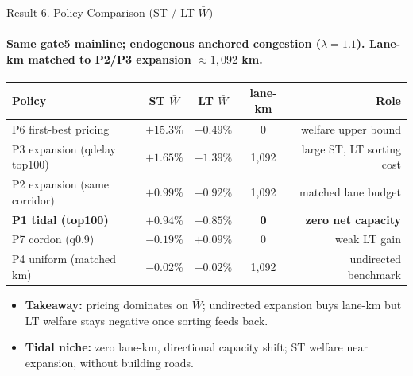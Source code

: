\documentclass[11pt,aspectratio=169]{beamer}
\newcommand{\good}[1]{\textcolor{blue!70!black}{#1}}
\newcommand{\bad}[1]{\textcolor{red!70!black}{#1}}
\newcommand{\app}[1]{\hyperlink{#1}{\beamergotobutton{details}}}
\begin{document}
\begin{frame}[label=result6]{Result 6. Policy Comparison (ST / LT $\bar W$)}
\framesubtitle{Same gate5 mainline; endogenous anchored congestion ($\lambda=1.1$). Lane-km matched to P2/P3 expansion $\approx 1{,}092$ km.}
\begin{center}\scriptsize
\begin{tabular}{lcccr}
\toprule
Policy & ST $\bar W$ & LT $\bar W$ & lane-km & Role \\
\midrule
P6 first-best pricing & \good{$+15.3\%$} & $-0.49\%$ & 0 & welfare upper bound \\
P3 expansion (qdelay top100) & \good{$+1.65\%$} & \bad{$-1.39\%$} & 1{,}092 & large ST, LT sorting cost \\
P2 expansion (same corridor) & $+0.99\%$ & $-0.92\%$ & 1{,}092 & matched lane budget \\
\textbf{P1 tidal (top100)} & \good{$+0.94\%$} & \bad{$-0.85\%$} & \good{\textbf{0}} & \textbf{zero net capacity} \\
P7 cordon (q0.9) & $-0.19\%$ & $+0.09\%$ & 0 & weak LT gain \\
P4 uniform (matched km) & $-0.02\%$ & $-0.02\%$ & 1{,}092 & undirected benchmark \\
\bottomrule
\end{tabular}
\end{center}
\vspace{0.3em}
\begin{itemize}\footnotesize
  \item \textbf{Takeaway:} pricing dominates on $\bar W$; undirected expansion buys lane-km but LT welfare stays negative once sorting feeds back.
  \item \textbf{Tidal niche:} \good{zero lane-km}, \good{directional} capacity shift; ST welfare near expansion, without building roads. \app{apppolicy}
\end{itemize}
\end{frame}
\end{document}
